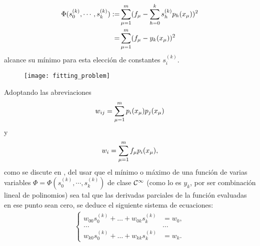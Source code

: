 \begin{align}
\label{ec: george 16}
\Phi(s_{0}^{(k)}, \cdots, s_{k}^{(k)})
:= & \sum\limits_{\mu = 1}^{m}(f_{\mu} - \sum\limits_{h=0}^{k}
s_{h}^{(k)} p_{h}(x_{\mu}))^{2} \nonumber \\
= &  \sum\limits_{\mu = 1}^{m}(f_{\mu} -  y_{k}(x_{\mu}) )^{2}
\end{align}
alcance su mínimo para esta elección de constantes
$s_{i}^{(k)}$.

\begin{figure}[H]
	\centering
	\texttt{[image: fitting\_problem]} 
\end{figure}	


Adoptando las abreviaciones
\begin{equation}
\label{eq: george 17}
w_{i j} = \sum\limits_{\mu=1}^{m}p_{i}(x_{\mu}) p_{j} (x_{\mu})
\end{equation}
y
\begin{equation*}
w_{i} = \sum\limits_{\mu = 1}^{m}f_{\mu}p_{i}(x_{\mu}),
\end{equation*}
como se discute en \cite{george}, del usar que
el mínimo o máximo de una función de varias variables
$\Phi = \Phi(s_{0}^{(k)}, \cdots, s_{k}^{(k)})$
de clase $\mathcal{C}^{\infty}$
(como lo es $y_{k}$, por ser combinación lineal de polinomios)
sea tal que las derivadas parciales de la función
evaluadas en ese punto sean cero, se deduce el siguiente
sistema de ecuaciones:
\begin{align*}
\begin{cases}
w_{00}s_{0}^{(k)} + \ldots + w_{0k}s_{k}^{(k)} & = w_{0}, \\
\ldots & \ldots \\
w_{k0}s_{0}^{(k)} + \ldots + w_{kk}s_{k}^{(k)} & = w_{k}.
\end{cases}
\end{align*}

